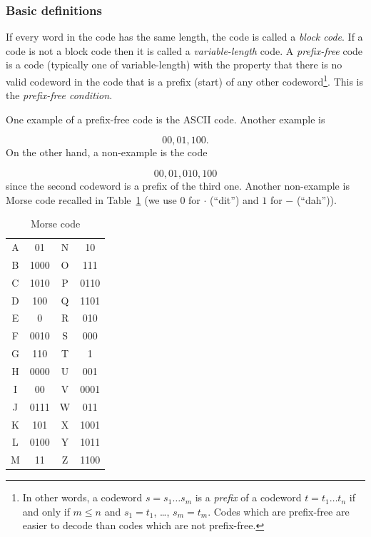 \subsubsection{Basic definitions}

If every word in the code has the same length, the code is called
a {\it block code}. If a code is not a block code then it is called
a {\it variable-length} code.
A {\it prefix-free} code is a code (typically one of variable-length)
with the property that there is no valid codeword in the code that
is a prefix (start) of any other codeword\footnote{In other words,
a codeword $s=s_1 \dots s_m$ is a {\it prefix} of a codeword
$t=t_1\dots t_n$ if and only if $m\leq n$ and
$s_1=t_1$, \dots, $s_m=t_m$. Codes which are prefix-free are easier
to decode than codes which are not prefix-free.}.
This is the {\it prefix-free condition}.

One example of a prefix-free code is the ASCII code.
Another example is

\[
00, 01, 100.
\]
On the other hand, a non-example is the code

\[
00, 01, 010, 100
\]
since the second codeword is a prefix of the third one.
Another non-example is Morse code recalled in
Table~\ref{tab:trees_forests:Morse_code} (we use $0$ for
$\cdot$ (``dit'') and $1$ for $-$ (``dah'')).

\begin{table}[!htbp]
\centering
\begin{tabular}{cc|cc} \hline
A & 01    & N & 10 \\
B & 1000  & O & 111 \\
C & 1010  & P & 0110 \\
D & 100   & Q & 1101 \\
E & 0     & R & 010 \\
F & 0010  & S & 000 \\
G & 110   & T & 1 \\
H & 0000  & U & 001 \\
I & 00    & V & 0001 \\
J & 0111  & W & 011 \\
K & 101   & X & 1001 \\
L & 0100  & Y & 1011 \\
M & 11    & Z & 1100 \\\hline
\end{tabular}
\caption{Morse code}
\label{tab:trees_forests:Morse_code}
\end{table}

